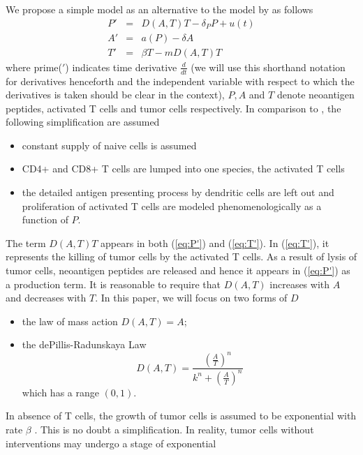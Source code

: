 \documentclass[review,authoryear]{elsarticle}
\begin{document}
We propose a simple model as an alternative to the model by \cite{Messan2021} as follows
\begin{subequations}\label{eq:3sp-model}
\begin{eqnarray} 
P' & = & D(A,T)T-\delta_{P}P+u(t)\label{eq:P'}\\
A' & = & a(P)-\delta A\label{eq:A'}\\
T' & = & \beta T-mD(A,T)T\label{eq:T'}
\end{eqnarray}
\end{subequations}
where prime($'$) indicates time derivative $\frac{d}{dt}$ (we will
use this shorthand notation for derivatives henceforth and the independent
variable with respect to which the derivatives is taken should be
clear in the context), $P, A$ and $T$ denote neoantigen peptides,
activated T cells and tumor cells respectively. In comparison to \cite{Messan2021},
the following simplification are assumed
\begin{itemize}
\item constant supply of naive cells is assumed 
\item CD4+ and CD8+ T cells are lumped into one species, the activated T
cells 
\item the detailed antigen presenting process by dendritic cells are left
out and proliferation of activated T cells are modeled phenomenologically
as a function of $P$.
\end{itemize}
The term $D(A,T)T$ appears in both (\ref{eq:P'}) and (\ref{eq:T'}).
In (\ref{eq:T'}), it represents the killing of tumor cells by the
activated T cells. As a result of lysis of tumor cells, neoantigen
peptides are released \citep{Konstorum2017} and hence it appears in
(\ref{eq:P'}) as a production term. It is reasonable to require that
$D(A,T)$ increases with $A$ and decreases with $T$. In this paper,
we will focus on two forms of $D$
\begin{itemize}
\item the law of mass action $D(A,T)=A$;
\item the dePillis-Radunskaya Law 
\begin{equation}
D(A,T)=\frac{(\frac{A}{T})^{n}}{k^{n}+(\frac{A}{T})^{n}}\label{eq:PR law-1}
\end{equation}
which has a range $(0,1)$. 
\end{itemize}
In absence of T cells, the growth of tumor cells is assumed to be exponential
with rate $\beta$ . This is no doubt a simplification. In reality,
tumor cells without interventions may undergo a stage of exponential
\end{document}
